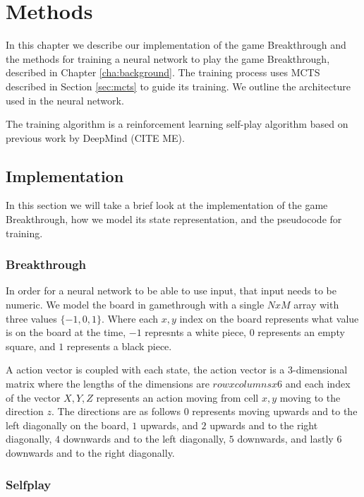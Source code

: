 \chapter{Methods\label{cha:methods}}

In this chapter we describe our implementation of the game Breakthrough and the methods for training a neural network to play the game Breakthrough, described in Chapter \ref{cha:background}. The training process uses MCTS described in Section \ref{sec:mcts} to guide its training. We outline the architecture used in the neural network.

The training algorithm is a reinforcement learning self-play algorithm based on previous work by DeepMind (CITE ME).

\section{Implementation}

In this section we will take a brief look at the implementation of the game Breakthrough, how we model its state representation, and the pseudocode for training.

\subsection{Breakthrough}

In order for a neural network to be able to use input, that input needs to be numeric. We model the board in gamethrough with a single $NxM$ array with three values $\{-1,0,1\}$. Where each $x,y$ index on the board represents what value is on the board at the time, $-1$ represnts a white piece, $0$ represents an empty square, and $1$ represents a black piece.

A action vector is coupled with each state, the action vector is a $3$-dimensional matrix where the lengths of the dimensions are $row x columns x 6$ and each index of the vector $X,Y,Z$ represents an action moving from cell $x,y$ moving to the direction $z$. The directions are as follows $0$ represents moving upwards and to the left diagonally on the board, $1$ upwards, and $2$ upwards and to the right diagonally, $4$ downwards and to the left diagonally, $5$ downwards, and lastly $6$ downwards and to the right diagonally.

\subsection{Selfplay}



